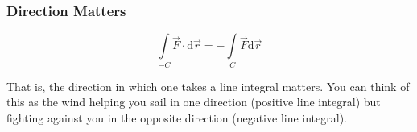 \subsubsection{Direction Matters}
\noindent
\begin{lemma}
	$$\int\limits_{-C}{\vec{F}\cdot\mathrm{d}\vec{r}}=-\int\limits_{C}{\vec{F}\mathrm{d}\vec{r}}$$
\end{lemma}
That is, the direction in which one takes a line integral matters. You can think of this as the wind helping you sail in one direction (positive line integral) but fighting against you in the opposite direction (negative line integral).\\